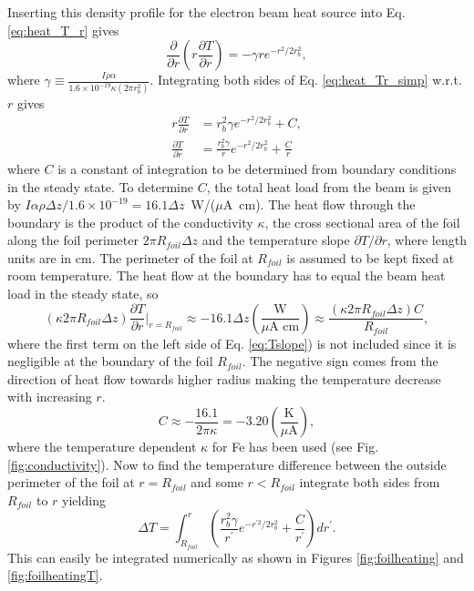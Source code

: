 \documentclass[12pt]{article}
\begin{document}
Inserting this density profile for the electron beam heat source into Eq. \ref{eq:heat_T_r} gives
\begin{equation}
\label{eq:heat_Tr_simp}
\frac{\partial}{\partial r}\left(r\frac{\partial T}{\partial r}\right)=-\gamma re^{-r^2/2r_b^2},
\end{equation} 
where $\gamma\equiv\frac{I\rho\alpha}{1.6\times 10^{-19} \kappa\left(2\pi r_{b}^2\right)}$.
Integrating both sides of Eq. \ref{eq:heat_Tr_simp} w.r.t. $r$ gives
\begin{align}
r\frac{\partial T}{\partial r}&=r_b^2\gamma e^{-r^2/2r_b^2}+C,\\
\label{eq:Tslope}
\frac{\partial T}{\partial r}&=\frac{r_b^2\gamma}{r} e^{-r^2/2r_b^2}+\frac{C}{r}
\end{align} 
where $C$ is a constant of integration to be determined from boundary conditions in the steady state. To determine $C$, the total heat load from the beam is given by $I\alpha\rho\Delta z/1.6\times10^{-19}=16.1\Delta z$~W/($\mu$A~cm). The heat flow through the boundary is the product of the conductivity $\kappa$, the cross sectional area of the foil along the foil perimeter $2\pi R_{foil}\Delta z$ and the temperature slope $\partial T /\partial r$, where  length units are in cm. The perimeter of the foil at $R_{foil}$ is assumed to be kept fixed at room temperature. The heat flow at the boundary has to equal the beam heat load in the steady state, so 
\[
\left(\kappa2\pi R_{foil}\Delta z\right) \frac{\partial T}{\partial r}|_{r=R_{foil}}\approx-16.1\Delta z\left(\frac{\textrm{W}}{\mu \textrm{A cm}}\right)\approx\frac{\left(\kappa2\pi R_{foil}\Delta z\right) C}{R_{foil}},
\]
where the first term on the left side of Eq. \ref{eq:Tslope}) is not included since it is negligible at the boundary of the foil $R_{foil}$. The negative sign comes from the direction of heat flow towards higher radius making the temperature decrease with increasing $r$.
\[
C\approx-\frac{16.1}{2\pi\kappa}=-3.20\left(\frac{\textrm{K}}{\mu\textrm{A}}\right),
\]
where the temperature dependent $\kappa$ for Fe has been used (see Fig. \ref{fig:conductivity}). Now to find the temperature difference between the outside perimeter of the foil at $r=R_{foil}$ and some $r<R_{foil}$ integrate both sides from $R_{foil}$ to $r$ yielding
\begin{equation}
\label{eq:dT}
\Delta T = \int_{R_{foil}}^r \left(\frac{r_b^2\gamma}{r^{\prime}} e^{-r^{\prime 2}/2r_b^2}+\frac{C}{r^{\prime}}\right)dr^{\prime}.
\end{equation}
This can easily be integrated numerically as shown in Figures  \ref{fig:foilheating} and \ref{fig:foilheatingT}.
\end{document}
